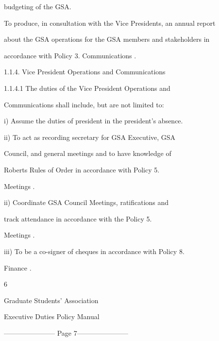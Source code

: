                    budgeting of the GSA.   

  

To produce, in consultation with the Vice Presidents, an annual report  

about the GSA operations for the GSA members and stakeholders in  

accordance with Policy 3. Communications .  

  

1.1.4. Vice President Operations and Communications  

1.1.4.1            The     duties      of    the    Vice      President        Operations         and  

         Communications shall include, but are not limited to:  

  

         i)        Assume the duties of president in the president’s absence.   

         ii)       To  act  as  recording  secretary  for  GSA  Executive,  GSA  

                   Council, and general meetings and to have knowledge of  

                   Roberts  Rules  of  Order  in  accordance  with  Policy  5.  

                   Meetings .   

  

         ii)       Coordinate   GSA   Council   Meetings,   ratifications   and  

                   track     attendance        in    accordance         with     the   Policy   5.  

                   Meetings .   

  

         iii)      To be a co-signer of cheques in accordance with Policy 8.  

                   Finance .   

  



                                                   6  

                                      

                                    Graduate Students’ Association  

                                    Executive Duties Policy Manual  

  


----------------------- Page 7-----------------------

